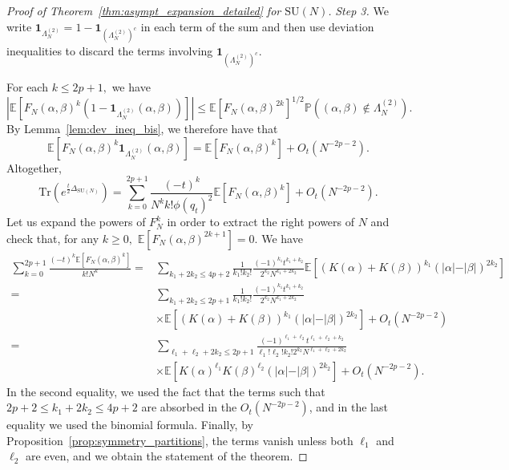 \documentclass[10pt,a4paper]{amsart}
\newcommand\E{\mathbb{E}}
\newcommand\Pbb{\mathbb{P}}
\newcommand\SU{{\mathrm{SU}}}
\newcommand\Tr{\mathrm{Tr}}
\begin{document}
\begin{proof}[Proof of Theorem~\ref{thm:asympt_expansion_detailed} for $\SU(N)$]
\emph{Step 3.} We write $\mathbf{1}_{\Lambda_N^{(2)}} = 1 - \mathbf{1}_{(\Lambda_N^{(2)})^c}$ in each term of the sum and then use deviation inequalities to discard the terms involving $\mathbf{1}_{(\Lambda_N^{(2)})^c}.$


For each $k \leq2p+1,$  we have
\[
\left\vert\E[F_{N}(\alpha,\beta)^k(1-\mathbf{1}_{\Lambda_N^{(2)}}(\alpha,\beta))]\right\vert\leq \E[F_{N}(\alpha, \beta)^{2k}]^{1/2}   \Pbb((\alpha,\beta)\notin\Lambda_N^{(2)}).
\]
By Lemma~\ref{lem:dev_ineq_bis}, we therefore have that
\[
\E[F_{N}(\alpha,\beta)^k\mathbf{1}_{\Lambda_N^{(2)}}(\alpha,\beta)]=\E[F_{N}(\alpha,\beta)^k]+O_t(N^{-2p-2}).
\]
Altogether,
\[
\Tr(e^{\frac{t}{2}\Delta_{\SU(N)}})=\sum_{k=0}^{2p+1}\frac{ (-t)^k  }{N^k k!\phi(q_t)^2}  \E[F_{N}(\alpha,\beta)^k]+O_t(N^{-2p-2}).
\]
Let us expand the powers of $F_{N}^k$ in order to extract the right powers of $N$ and check that, for any $k\geq 0,$ $\E[F_{N}(\alpha,\beta)^{2k+1}] =0.$ We have
\begin{align*}
\sum_{k=0}^{2p+1}\frac{(-t)^k\E[F_{N}(\alpha,\beta)^k]}{k!N^k}= &  \sum_{k_1+ 2k_2\leq 4p+2} \frac{1}{k_1!k_2!}\frac{(-1)^{k_1}t^{k_1+k_2}}{2^{k_2}N^{k_1+2k_2}}\E[(K(\alpha)+K(\beta))^{k_1}(\vert\alpha\vert-\vert\beta\vert)^{2k_2}]\\
= & \sum_{k_1+2k_2\leq 2p+1}\frac{1}{k_1!k_2!}\frac{(-1)^{k_1}t^{k_1+k_2}}{2^{k_2}N^{k_1+2k_2}}\\
&\times \E[(K(\alpha)+K(\beta))^{k_1}(\vert\alpha\vert-\vert\beta\vert)^{2k_2}] + O_t(N^{-2p-2})\\
= & \sum_{\ell_1+\ell_2+2k_2\leq 2p+1}\frac{(-1)^{\ell_1+\ell_2}t^{\ell_1+\ell_2+k_2}}{\ell_1!\ell_2!k_2!2^{k_2}N^{\ell_1+\ell_2+2k_2}}\\
&\times \E[K(\alpha)^{\ell_1}K(\beta)^{\ell_2}(\vert\alpha\vert-\vert\beta\vert)^{2k_2}]+O_t(N^{-2p-2}).
\end{align*}
In the second equality, we used the fact that the terms such that $2p+2 \leq k_1+2k_2 \leq4p+2$ are absorbed in the $O_t(N^{-2p-2})$, and in the last equality we used the binomial formula. Finally, by Proposition~\ref{prop:symmetry_partitions}, the terms vanish unless both $\ell_1$ and $\ell_2$ are even, and we obtain the statement of the theorem.
\end{proof}
\end{document}
